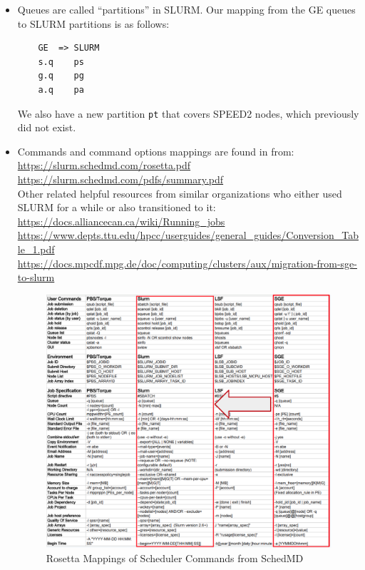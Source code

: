 \begin{itemize}
\item
Queues are called ``partitions'' in SLURM. Our mapping from the GE queues to SLURM partitions is as follows:
\begin{verbatim}
    GE  => SLURM
    s.q    ps
    g.q    pg
    a.q    pa
\end{verbatim}
We also have a new partition \texttt{pt} that covers SPEED2 nodes, which previously did not exist.

\item
Commands and command options mappings are found in  from:\\
\url{https://slurm.schedmd.com/rosetta.pdf}\\
\url{https://slurm.schedmd.com/pdfs/summary.pdf}\\
Other related helpful resources from similar organizations who either used SLURM for a while or also transitioned to it:\\
\url{https://docs.alliancecan.ca/wiki/Running_jobs}\\
\url{https://www.depts.ttu.edu/hpcc/userguides/general_guides/Conversion_Table_1.pdf}\\
\url{https://docs.mpcdf.mpg.de/doc/computing/clusters/aux/migration-from-sge-to-slurm}

\begin{figure}[htpb]
    \includegraphics[width=\columnwidth]{images/rosetta-mapping}
    \caption{Rosetta Mappings of Scheduler Commands from SchedMD}
    \label{fig:rosetta-mappings}
\end{figure}


\end{itemize}
